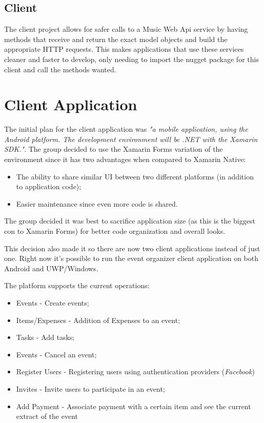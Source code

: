 \subsection{Client}
The client project allows for safer calls to a Music Web Api service by having methods that receive and return the exact model objects and build the appropriate HTTP requests. This makes applications that use these services cleaner and faster to develop, only needing to import the nugget package for this client and call the methods wanted.

\section{Client Application}

The initial plan for the client application was \textit{"a mobile application, using the \textit{Android} platform. The development environment will be .NET with the \textit{Xamarin} SDK."}. The group decided to use the Xamarin Forms variation of the environment since it has two advantages when compared to Xamarin Native:

\begin{itemize}
	\item The ability to share similar UI between two different platforms (in addition to application code);
	
	\item Easier maintenance since even more code is shared.
\end{itemize}

The group decided it was best to sacrifice application size (as this is the biggest con to Xamarin Forms) for better code organization and overall looks.

This decision also made it so there are now two client applications instead of just one. Right now it's possible to run the event organizer client application on both Android and UWP/Windows.

The platform supports the current operations:

\begin{itemize}
	\item Events - Create events;
	
	\item Items/Expenses - Addition of Expenses to an event;
	
	\item Tasks - Add tasks;
	
	\item Events - Cancel an event;
	
	\item Register Users - Registering users using authentication providers (\textit{Facebook})
	
	\item Invites - Invite users to participate in an event;
	
	\item Add Payment - Associate payment with a certain item and see the current extract of the event
\end{itemize}





